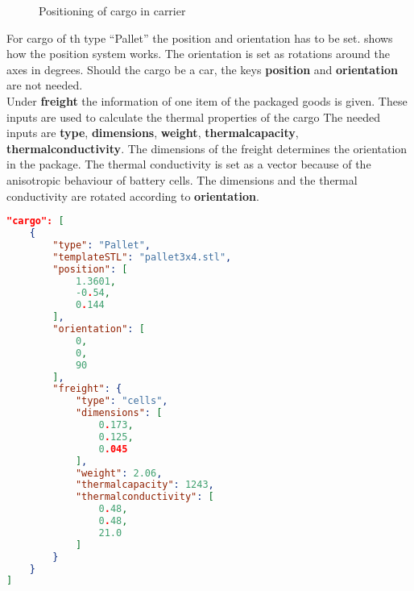 \documentclass[%
FTMstudentthesis%
,optArial%
,optBiber%
,optEnglish%
,optCMYK%
]{FTMlatex}%
\def\ContinueLineNumber{\lstset{firstnumber=last}}
\begin{document}
\begin{figure}[!htbp]
	\centering
	
	\caption{Positioning of cargo in carrier}
	\label{fig:positioning}
\end{figure}
%
For cargo of th type ``Pallet'' the position and orientation has to be set.  shows how the position system works. The orientation is set as rotations around the axes in degrees. Should the cargo be a car, the keys \textbf{position} and \textbf{orientation} are not needed.\\%
Under \textbf{freight} the information of one item of the packaged goods is given. These inputs are used to calculate the thermal properties of the cargo The needed inputs are \textbf{type}, \textbf{dimensions}, \textbf{weight}, \textbf{thermalcapacity}, \textbf{thermalconductivity}.  The dimensions of the freight determines the orientation in the package. The thermal conductivity is set as a vector because of the anisotropic behaviour of battery cells. The dimensions and the thermal conductivity are rotated according to \textbf{orientation}.%

\begin{code}
\ContinueLineNumber
\begin{lstlisting}[language=json]
"cargo": [
	{
		"type": "Pallet",
		"templateSTL": "pallet3x4.stl",
		"position": [
			1.3601,
			-0.54,
			0.144
		],
		"orientation": [
			0,
			0,
			90
		],
		"freight": {
			"type": "cells",
			"dimensions": [
				0.173,
				0.125,
				0.045
			],
			"weight": 2.06,
			"thermalcapacity": 1243,
			"thermalconductivity": [
				0.48,
				0.48,
				21.0
			]
		}
	}
]
\end{lstlisting}
\end{code}%
%
\end{document}
